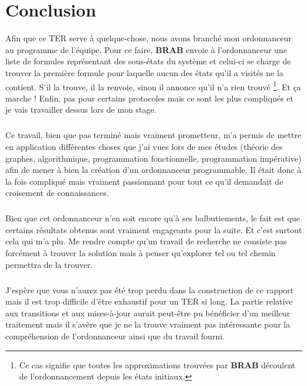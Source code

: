 \documentclass{memoir}
\begin{document}
	 \chapter{Conclusion}
	 \label{chap:concl}
	 
	 	Afin que ce TER serve à quelque-chose, nous avons branché mon ordonnanceur au programme de l'équipe. Pour ce faire, \textbf{BRAB} envoie à l'ordonnanceur une liste de formules représentant des sous-états du système et celui-ci se charge de trouver la première formule pour laquelle aucun des états qu'il a visités ne la contient. S'il la trouve, il la renvoie, sinon il annonce qu'il n'a rien trouvé \footnote{Ce cas signifie que toutes les approximations trouvées par \textbf{BRAB} découlent de l'ordonnancement depuis les états initiaux.}. Et ça marche ! Enfin, pas pour certains protocoles mais ce sont les plus compliqués et je vais travailler dessus lors de mon stage.
	 
	 	\paragraph{} Ce travail, bien que pas terminé mais vraiment prometteur, m'a permis de mettre en application différentes choses que j'ai vues lors de mes études (théorie des graphes, algorithmique, programmation fonctionnelle, programmation impérative) afin de mener à bien la création d'un ordonnanceur programmable. Il était donc à la fois compliqué mais vraiment passionnant pour tout ce qu'il demandait de croisement de connaissances.
	 	
	 	 \paragraph{} Bien que cet ordonnanceur n'en soit encore qu'à ses balbutiements, le fait est que certains résultats obtenus sont vraiment engageants pour la suite. Et c'est surtout cela qui m'a plu. Me rendre compte qu'un travail de recherche ne consiste pas forcément à trouver la solution mais à penser qu'explorer tel ou tel chemin permettra de la trouver. 
	 	 
	 	 \paragraph{} J'espère que vous n'aurez pas été trop perdu dans la construction de ce rapport mais il est trop difficile d'être exhaustif pour un TER si long. La partie relative aux transitions et aux mises-à-jour aurait peut-être pu bénéficier d'un meilleur traitement mais il s'avère que je ne la trouve vraiment pas intéressante pour la compréhension de l'ordonnanceur ainsi que du travail fourni.
	 	 
\end{document}
